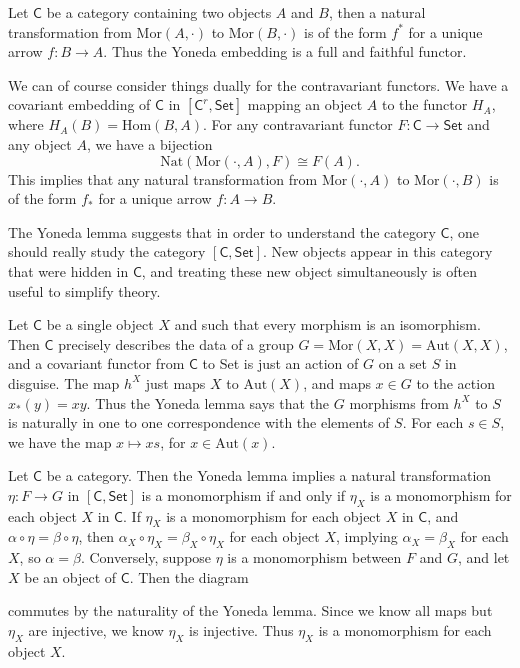 \begin{corollary}
    Let $\mathsf{C}$ be a category containing two objects $A$ and $B$, then a natural transformation from $\text{Mor}(A,\cdot)$ to $\text{Mor}(B,\cdot)$ is of the form $f^*$ for a unique arrow $f: B \to A$. Thus the Yoneda embedding is a full and faithful functor.
\end{corollary}

We can of course consider things dually for the contravariant functors. We have a covariant embedding of $\mathsf{C}$ in $[\mathsf{C}^r, \mathsf{Set}]$ mapping an object $A$ to the functor $H_A$, where $H_A(B) = \text{Hom}(B,A)$. For any contravariant functor $F: \mathsf{C} \to \mathsf{Set}$ and any object $A$, we have a bijection
%
\[ \text{Nat}(\text{Mor}(\cdot,A),F) \cong F(A). \]
%
This implies that any natural transformation from $\text{Mor}(\cdot,A)$ to $\text{Mor}(\cdot,B)$ is of the form $f_*$ for a unique arrow $f: A \to B$.

The Yoneda lemma suggests that in order to understand the category $\mathsf{C}$, one should really study the category $[\mathsf{C}, \mathsf{Set}]$. New objects appear in this category that were hidden in $\mathsf{C}$, and treating these new object simultaneously is often useful to simplify theory.

\begin{example}
    Let $\mathsf{C}$ be a single object $X$ and such that every morphism is an isomorphism. Then $\mathsf{C}$ precisely describes the data of a group $G = \text{Mor}(X,X) = \text{Aut}(X,X)$, and a covariant functor from $\mathsf{C}$ to {\sf Set} is just an action of $G$ on a set $S$ in disguise. The map $h^X$ just maps $X$ to $\text{Aut}(X)$, and maps $x \in G$ to the action $x_*(y) = xy$. Thus the Yoneda lemma says that the $G$ morphisms from $h^X$ to $S$ is naturally in one to one correspondence with the elements of $S$. For each $s \in S$, we have the map $x \mapsto xs$, for $x \in \text{Aut}(x)$.
\end{example}

Let $\mathsf{C}$ be a category. Then the Yoneda lemma implies a natural transformation $\eta: F \to G$ in $[\mathsf{C},\mathsf{Set}]$ is a monomorphism if and only if $\eta_X$ is a monomorphism for each object $X$ in $\mathsf{C}$. If $\eta_X$ is a monomorphism for each object $X$ in $\mathsf{C}$, and $\alpha \circ \eta = \beta \circ \eta$, then $\alpha_X \circ \eta_X = \beta_X \circ \eta_X$ for each object $X$, implying $\alpha_X = \beta_X$ for each $X$, so $\alpha = \beta$. Conversely, suppose $\eta$ is a monomorphism between $F$ and $G$, and let $X$ be an object of $\mathsf{C}$. Then the diagram
%
\begin{center}
\end{center}
%
commutes by the naturality of the Yoneda lemma. Since we know all maps but $\eta_X$ are injective, we know $\eta_X$ is injective. Thus $\eta_X$ is a monomorphism for each object $X$.

